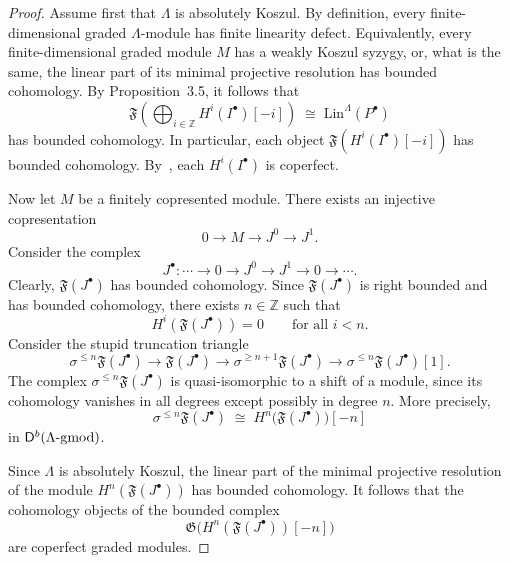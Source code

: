 \documentclass[11pt]{article}
\theoremstyle{definition}
\theoremstyle{remark}
\begin{document}
\begin{proof}
Assume first that \(\Lambda\) is absolutely Koszul. By definition, every finite-dimensional graded \(\Lambda\)-module has finite linearity defect. Equivalently, every finite-dimensional graded module \(M\) has a weakly Koszul syzygy, or, what is the same, the linear part of its minimal projective resolution has bounded cohomology. By Proposition~3.5, it follows that
\[
\mathfrak{F}\!\left(\bigoplus_{i \in \mathbb{Z}} H^{i}(I^{\bullet})[-i]\right)
\;\cong\;
\mathrm{Lin}^{\Lambda}(P^{\bullet})
\]
has bounded cohomology. In particular, each object \(\mathfrak{F}(H^{i}(I^{\bullet})[-i])\) has bounded cohomology. By~\cite[Proposition~3.4]{4}, each \(H^{i}(I^{\bullet})\) is coperfect.

Now let \(M\) be a finitely copresented module. There exists an injective copresentation
\[
0 \longrightarrow M \longrightarrow J^{0} \longrightarrow J^{1}.
\]
Consider the complex
\[
J^{\bullet}\colon \cdots \longrightarrow 0 \longrightarrow J^{0} \longrightarrow J^{1} \longrightarrow 0 \longrightarrow \cdots.
\]
Clearly, \(\mathfrak{F}(J^{\bullet})\) has bounded cohomology. Since \(\mathfrak{F}(J^\bullet)\) is right bounded and has bounded cohomology, there exists \(n\in\mathbb Z\) such that
\[
H^i(\mathfrak{F}(J^\bullet))=0 \qquad \text{for all } i<n.
\]
Consider the stupid truncation triangle
\[
\sigma^{\le n}\mathfrak{F}(J^\bullet)
\longrightarrow
\mathfrak{F}(J^\bullet)
\longrightarrow
\sigma^{\ge n+1}\mathfrak{F}(J^\bullet)
\longrightarrow
\sigma^{\le n}\mathfrak{F}(J^\bullet)[1].
\]
The complex \(\sigma^{\le n}\mathfrak{F}(J^\bullet)\) is quasi-isomorphic to a shift of a module, since its cohomology vanishes in all degrees except possibly in degree \(n\). More precisely,
\[
\sigma^{\le n}\mathfrak{F}(J^\bullet)
\;\cong\;
H^{n}\!\bigl(\mathfrak{F}(J^\bullet)\bigr)[-n]
\]
in \(\mathsf{D}^{b}(\Lambda\textup{-gmod})\).

Since \(\Lambda\) is absolutely Koszul, the linear part of the minimal projective resolution of the module \(H^{n}(\mathfrak{F}(J^\bullet))\) has bounded cohomology. It follows that the cohomology objects of the bounded complex
\[
\mathfrak{G}\!\bigl(H^{n}(\mathfrak{F}(J^\bullet))[-n]\bigr)
\]
are coperfect graded modules.


\end{proof}
\end{document}
